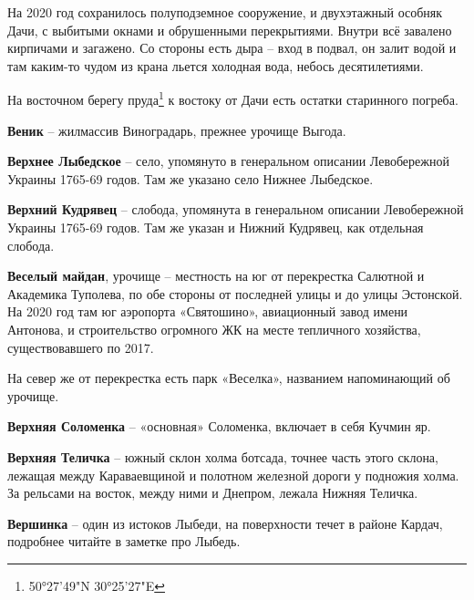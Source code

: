 На 2020 год сохранилось полуподземное сооружение, и двухэтажный особняк Дачи, с выбитыми окнами и обрушенными перекрытиями. Внутри всё завалено кирпичами и загажено. Со стороны есть дыра – вход в подвал, он залит водой и там каким-то чудом из крана льется холодная вода, небось десятилетиями.

На восточном берегу пруда\footnote{50°27'49"N 30°25'27"E} к востоку от Дачи есть остатки старинного погреба.\\  

\medskip

\textbf{Веник} – жилмассив Виноградарь, прежнее урочище Выгода.\\

\newpage

\textbf{Верхнее Лыбедское} – село, упомянуто в генеральном описании Левобережной Украины 1765-69 годов. Там же указано село Нижнее Лыбедское.\\

\medskip

\textbf{Верхний Кудрявец} – слобода, упомянута в генеральном описании Левобережной Украины 1765-69 годов. Там же указан и Нижний Кудрявец, как отдельная слобода.\\

\medskip

\textbf{Веселый майдан}, урочище – местность на юг от перекрестка Салютной и Академика Туполева, по обе стороны от последней улицы и до улицы Эстонской. На 2020 год там юг аэропорта «Святошино», авиационный завод имени Антонова, и строительство огромного ЖК на месте тепличного хозяйства, существовавшего по 2017. 

На север же от перекрестка есть парк «Веселка», названием напоминающий об урочище.\\

\medskip

\textbf{Верхняя Соломенка} – «основная» Соломенка, включает в себя Кучмин яр.\\

\medskip

\textbf{Верхняя Теличка} – южный склон холма ботсада, точнее часть этого склона, лежащая между Караваевщиной и полотном железной дороги у подножия холма. За рельсами на восток, между ними и Днепром, лежала Нижняя Теличка.\\

\newpage

\textbf{Вершинка} – один из истоков Лыбеди, на поверхности течет в районе Кардач, подробнее читайте в заметке про Лыбедь. 

